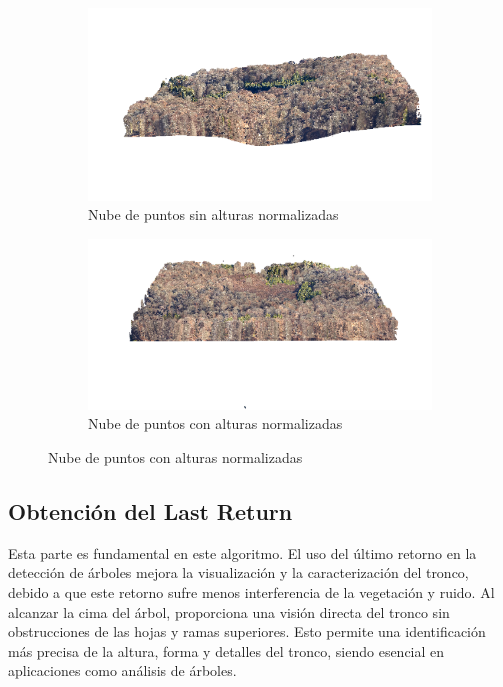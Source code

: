 \begin{figure}[h]
  \begin{subfigure}{0.5\textwidth}
    \centering
    \includegraphics[width=0.8\linewidth]{imaxes/nohag.png}
    \caption{Nube de puntos sin alturas normalizadas}
    \label{fig:sub1}
  \end{subfigure}%
  \begin{subfigure}{0.5\textwidth}
    \centering
    \includegraphics[width=0.8\linewidth]{imaxes/hag.png}
    \caption{Nube de puntos con alturas normalizadas}
    \label{fig:sub2}
  \end{subfigure}
  \label{fig:algo1}
\end{figure}

\subsection{Obtención del Last Return}
\label{chap:LastAlgo}

Esta parte es fundamental en este algoritmo. El uso del último retorno en la detección de árboles mejora la visualización y la caracterización del tronco, debido a que este retorno sufre menos interferencia de la vegetación y ruido. Al alcanzar la cima del árbol, proporciona una visión directa del tronco sin obstrucciones de las hojas y ramas superiores. Esto permite una identificación más precisa de la altura, forma y detalles del tronco, siendo esencial en aplicaciones como análisis de árboles.

